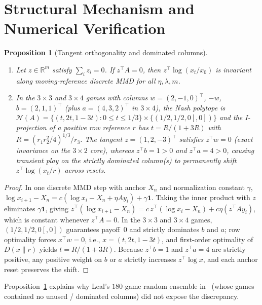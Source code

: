 \documentclass[11pt]{article}
\theoremstyle{plain}
\newtheorem{proposition}[theorem]{Proposition}
\theoremstyle{definition}
\theoremstyle{remark}
\newcommand{\NE}{\mathcal{N}}
\begin{document}
\section{Structural Mechanism and Numerical Verification}

\begin{proposition}[Tangent orthogonality and dominated columns]\label{prop:tangent}
\begin{enumerate}[label=\textup{(\arabic*)}]
\item Let $z \in \mathbb{R}^m$ satisfy $\sum_i z_i = 0$. If $z^\top A = 0$, then $z^\top \log(x_t / x_0)$ is invariant along moving-reference discrete MMD for all $\eta, \lambda, m$.
\item In the $3\times 3$ and $3\times 4$ games with columns $w = (2,-1,0)^\top$, $-w$, $b = (2,1,1)^\top$ (plus $a = (4,3,2)^\top$ in $3\times 4$), the Nash polytope is $\NE(A) = \{(t, 2t, 1 - 3t) : 0 \le t \le 1/3\} \times \{(1/2, 1/2, 0[, 0])\}$ and the I-projection of a positive row reference $r$ has $t = R/(1 + 3R)$ with $R = (r_1 r_2^2/4)^{1/3}/r_3$. The tangent $z = (1, 2, -3)^\top$ satisfies $z^\top w = 0$ (exact invariance on the $3\times 2$ core), whereas $z^\top b = 1 > 0$ and $z^\top a = 4 > 0$, causing transient play on the strictly dominated column(s) to permanently shift $z^\top \log(x_t / r)$ across resets.
\end{enumerate}
\end{proposition}

\begin{proof}
In one discrete MMD step with anchor $X_n$ and normalization constant $\gamma$, $\log x_{i+1} - X_n = c(\log x_i - X_n + \eta A y_i) + \gamma\mathbf{1}$. Taking the inner product with $z$ eliminates $\gamma\mathbf{1}$, giving $z^\top(\log x_{i+1} - X_n) = c\,z^\top(\log x_i - X_n) + c\eta(z^\top A y_i)$, which is constant whenever $z^\top A = 0$.
In the $3\times 3$ and $3\times 4$ games, $(1/2, 1/2, 0[, 0])$ guarantees payoff~$0$ and strictly dominates $b$ and $a$; row optimality forces $x^\top w = 0$, i.e., $x = (t, 2t, 1 - 3t)$, and first-order optimality of $D(x \| r)$ yields $t = R/(1 + 3R)$. Because $z^\top b = 1$ and $z^\top a = 4$ are strictly positive, any positive weight on $b$ or $a$ strictly increases $z^\top \log x$, and each anchor reset preserves the shift.
\end{proof}

Proposition~\ref{prop:tangent} explains why Leal's $180$-game random ensemble in~\cite{Leal2026} (whose games contained no unused / dominated columns) did not expose the discrepancy.
\end{document}
